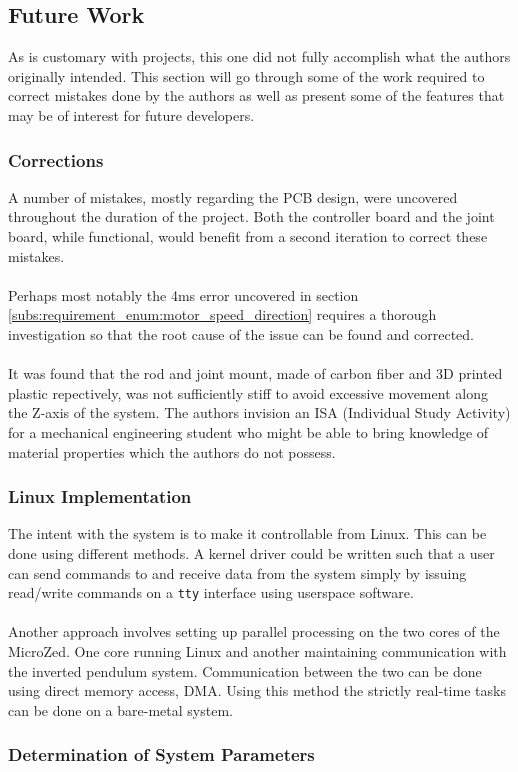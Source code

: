 \subsection{Future Work}
\label{sub:future_work}
As is customary with projects, this one did not fully accomplish what the authors originally intended.
This section will go through some of the work required to correct mistakes done by the authors as well as present some of the features that may be of interest for future developers.

\subsubsection{Corrections} %
\label{ssub:corrections}
A number of mistakes, mostly regarding the PCB design, were uncovered throughout the duration of the project.
Both the controller board and the joint board, while functional, would benefit from a second iteration to correct these mistakes.
\\~\\
Perhaps most notably the 4ms error uncovered in section \ref{subs:requirement_enum:motor_speed_direction} requires a thorough investigation so that the root cause of the issue can be found and corrected. 
\\~\\
It was found that the rod and joint mount, made of carbon fiber and 3D printed plastic repectively, was not sufficiently stiff to avoid excessive movement along the Z-axis of the system.
The authors invision an ISA (Individual Study Activity) for a mechanical engineering student who might be able to bring knowledge of material properties which the authors do not possess.
\subsubsection{Linux Implementation} %
\label{ssub:linux_implementation}
The intent with the system is to make it controllable from Linux.
This can be done using different methods.
A kernel driver could be written such that a user can send commands to and receive data from the system simply by issuing read/write commands on a \texttt{tty} interface using userspace software.
\\~\\
Another approach involves setting up parallel processing on the two cores of the MicroZed.
One core running Linux and another maintaining communication with the inverted pendulum system.
Communication between the two can be done using direct memory access, DMA.
Using this method the strictly real-time tasks can be done on a bare-metal system.
\subsubsection{Determination of System Parameters} %
\label{ssub:determination_of_system_parameters}


